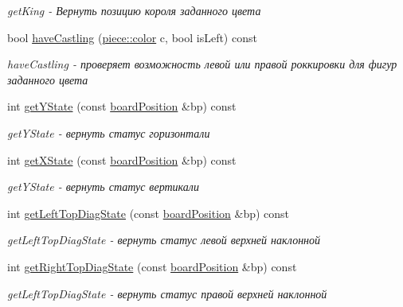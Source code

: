 \begin{DoxyCompactItemize}
\begin{DoxyCompactList}\small\item\em get\+King -\/ Вернуть позицию короля заданного цвета \end{DoxyCompactList}\item 
bool \hyperlink{classboard_a86dbad33c8e8c28015db47d78a0c2afc}{have\+Castling} (\hyperlink{classpiece_a0e121e5952345fd0e7014a8e6a1fbbda}{piece\+::color} c, bool is\+Left) const 
\begin{DoxyCompactList}\small\item\em have\+Castling -\/ проверяет возможность левой или правой роккировки для фигур заданного цвета \end{DoxyCompactList}\item 
int \hyperlink{classboard_a02dc94d46def16861d0d8049e074fc8f}{get\+Y\+State} (const \hyperlink{classboard_position}{board\+Position} \&bp) const 
\begin{DoxyCompactList}\small\item\em get\+Y\+State -\/ вернуть статус горизонтали \end{DoxyCompactList}\item 
int \hyperlink{classboard_a23f6cf511a4ddf7f163949bfb2442f68}{get\+X\+State} (const \hyperlink{classboard_position}{board\+Position} \&bp) const 
\begin{DoxyCompactList}\small\item\em get\+Y\+State -\/ вернуть статус вертикали \end{DoxyCompactList}\item 
int \hyperlink{classboard_a5d1437aa494539ee661f00f248cb0a2a}{get\+Left\+Top\+Diag\+State} (const \hyperlink{classboard_position}{board\+Position} \&bp) const 
\begin{DoxyCompactList}\small\item\em get\+Left\+Top\+Diag\+State -\/ вернуть статус левой верхней наклонной \end{DoxyCompactList}\item 
int \hyperlink{classboard_aeb9a53a91c2a34b15bdec9de604e713e}{get\+Right\+Top\+Diag\+State} (const \hyperlink{classboard_position}{board\+Position} \&bp) const 
\begin{DoxyCompactList}\small\item\em get\+Left\+Top\+Diag\+State -\/ вернуть статус правой верхней наклонной \end{DoxyCompactList}\end{DoxyCompactItemize}

